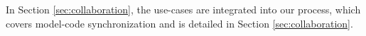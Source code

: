 
In Section \ref{sec:collaboration}, the use-cases are integrated into
our process, which covers model-code synchronization and is detailed in Section \ref{sec:collaboration}.


